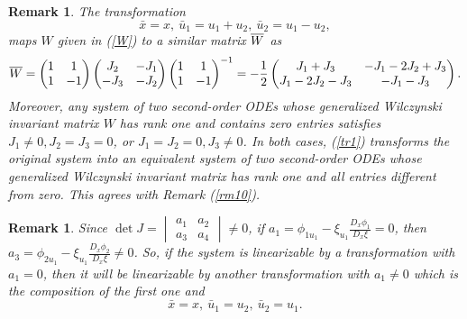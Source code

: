 \documentclass[12pt]{article}
\newtheorem{remark}[theorem]{Remark}
\begin{document}
\begin{remark}\label{Rm1} 
 The transformation 
\begin{equation}\label{tr1}
\bar{x}=x, ~\bar{u}_1=u_1+u_2,~\bar{u}_2=u_1-u_2,
\end{equation}
  maps $W$ given in (\ref{W}) to a similar matrix $\overline{\vphantom{x}W}$ as
\begin{equation}
\overline{\vphantom{x}W}=\begin{pmatrix}
1&1\\
1&-1\\
\end{pmatrix}\begin{pmatrix}
J_2&-J_1\\
-J_3&-J_2\\
\end{pmatrix}\begin{pmatrix}
1&1\\
1&-1
\end{pmatrix}^{-1}=-\frac{1}{2}\begin{pmatrix}
J_1+J_3&-J_1-2J_2+J_3\\
J_1-2J_2-J_3&-J_1-J_3
\end{pmatrix}.
\end{equation}
Moreover, any system of two second-order ODEs whose generalized Wilczynski invariant matrix $W$ has rank one and contains zero entries satisfies $J_1\neq0,J_2=J_3=0$, or $J_1=J_2=0,J_3\neq0$. In both cases, (\ref{tr1}) transforms the original system into an equivalent system of two second-order ODEs whose generalized Wilczynski invariant matrix has rank one and all entries different from zero. This agrees with Remark (\ref{rm10}).
\end{remark}
\begin{remark}\label{a1}
Since $\det J=\begin{vmatrix}
a_1&a_2\\
a_3&a_4
\end{vmatrix}\neq0$, if $a_1=\phi_{1u_1}-\xi_{u_1}\frac{D_x\phi_1}{D_x\xi}=0$, then $a_3=\phi_{2u_1}-\xi_{u_1}\frac{D_x\phi_2}{D_x\xi}\neq0$. So, if the system is linearizable by a transformation with $a_1=0$, then it will be linearizable by another transformation with $a_1\neq0$ which is the composition of the first one and 
\begin{equation}\label{tr1-1}
\bar{x}=x, ~\bar{u}_1=u_2,~\bar{u}_2=u_1.
\end{equation}
\end{remark}


\end{document}
